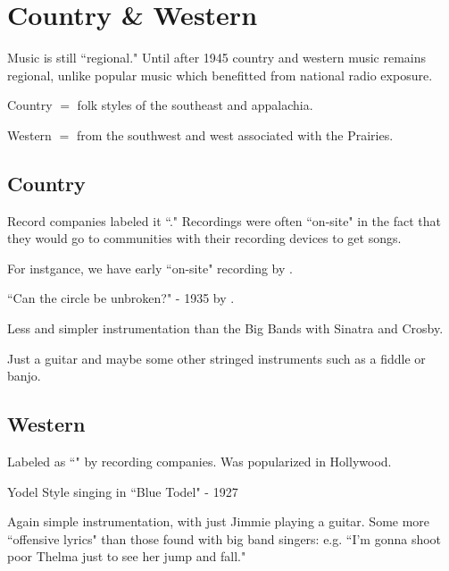 \documentclass[12pt, a4paper, twoside, openright, titlepage]{book}
\begin{document}
\section{Country \& Western}

Music is still ``regional." Until after 1945 country and western music remains regional, unlike popular music which benefitted from national radio exposure.

\begin{rmk}{}{}
    Country $=$ folk styles of the southeast and appalachia.
\end{rmk}

\begin{rmk}{}{}
    Western $=$ from the southwest and west associated with the Prairies.
\end{rmk}

\subsection{Country}


Record companies labeled it ``." Recordings were often ``on-site" in the fact that they would go to communities with their recording devices to get songs.

For instgance, we have early ``on-site" recording by .

\begin{eg}{}{}
    ``Can the circle be unbroken?" - 1935 by .

    Less and simpler instrumentation than the Big Bands with Sinatra and Crosby.

    Just a guitar and maybe some other stringed instruments such as a fiddle or banjo.
\end{eg}


\subsection{Western}

Labeled as ``" by recording companies. Was popularized in Hollywood.

\begin{eg}{}{}
     Yodel Style singing in ``Blue Todel" - 1927


    Again simple instrumentation, with just Jimmie playing a guitar. Some more ``offensive lyrics" than those found with big band singers: e.g. ``I'm gonna shoot poor Thelma just to see her jump and fall."
\end{eg}
\end{document}
